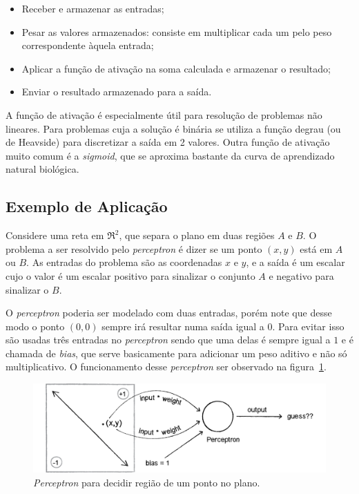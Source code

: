 \begin{itemize}
\item
  Receber e armazenar as entradas;
\item
  Pesar as valores armazenados: consiste em multiplicar cada um pelo peso correspondente àquela entrada;
\item
  Aplicar a função de ativação na soma calculada e armazenar o resultado;
\item
  Enviar o resultado armazenado para a saída.
\end{itemize}

A função de ativação é especialmente útil para resolução de problemas não
lineares. Para problemas cuja a solução é binária se utiliza a função degrau
(ou de Heavside) para discretizar a saída em 2 valores. Outra função de
ativação muito comum é a \textit{sigmoid}, que se aproxima bastante da curva de
aprendizado natural biológica.

\subsection{Exemplo de Aplicação}

Considere uma reta em $\Re^2$, que separa o plano em duas regiões $A$ e $B$. O problema a
ser resolvido pelo \textit{perceptron} é dizer se um ponto $(x,y)$ está em $A$ ou $B$. As entradas do
problema são as coordenadas $x$ e $y$, e a saída é um escalar cujo o valor é um escalar positivo
para sinalizar o conjunto $A$ e negativo para sinalizar o $B$.

O \textit{perceptron} poderia ser modelado com duas entradas, porém note que desse modo o
ponto $(0,0)$ sempre irá resultar numa saída igual a $0$. Para evitar isso são usadas três entradas
no \textit{perceptron} sendo que uma delas é sempre igual a $1$ e é chamada de \emph{bias}, que serve
basicamente para adicionar um peso aditivo e não só multiplicativo. O funcionamento desse \textit{perceptron}
ser observado na figura~\ref{fig:rede_neural_simple_problem}.

\begin{figure}[ht]
\centering
\includegraphics[width=15cm]{figuras/rede_neural_simple_problem}
\caption{\textit{Perceptron} para decidir região de um ponto no plano.}\label{fig:rede_neural_simple_problem}
\end{figure}

